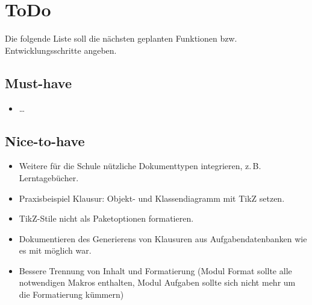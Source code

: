 \section{ToDo}
    Die folgende Liste soll die nächsten geplanten Funktionen bzw. Entwicklungsschritte angeben.

    \subsection{Must-have}
        \begin{itemize}
            \item \ldots
        \end{itemize}
    \subsection{Nice-to-have}
        \begin{itemize}
            \item Weitere für die Schule nützliche Dokumenttypen integrieren, z.\,B. Lerntagebücher.
            \item Praxisbeispiel Klausur: Objekt- und Klassendiagramm mit TikZ setzen.
            \item TikZ-Stile nicht als Paketoptionen formatieren.
            \item Dokumentieren des Generierens von Klausuren aus Aufgabendatenbanken wie es mit  möglich war.
            \item Bessere Trennung von Inhalt und Formatierung (Modul Format sollte alle notwendigen Makros enthalten, Modul Aufgaben sollte sich nicht mehr um die Formatierung kümmern)
        \end{itemize}